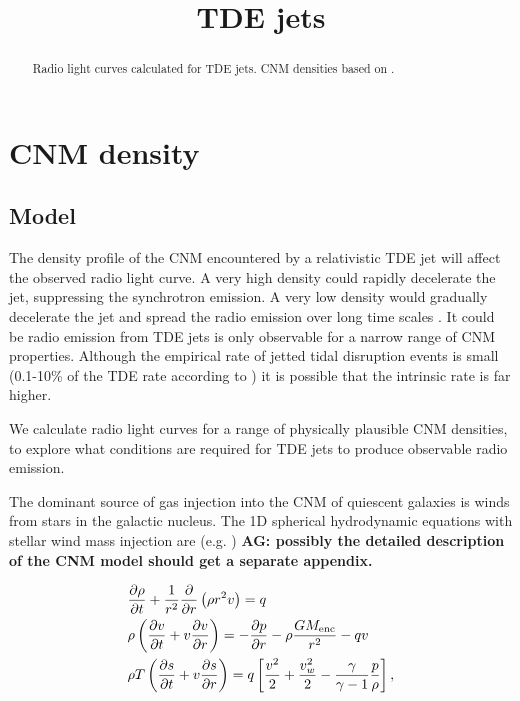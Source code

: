 \documentclass[usenatbib,fleqn]{mn2e}
\title{TDE jets}
\begin{document}
\begin{abstract}
  Radio light curves calculated for TDE jets. CNM
  densities based on \citet{Generozov+2015}. 
\end{abstract}


\section{CNM density}

\subsection{Model}

The density profile of the CNM encountered by a relativistic TDE jet
will affect the observed radio light curve. A very high density could
rapidly decelerate the jet, suppressing the synchrotron emission. A
very low density would gradually decelerate the jet and spread the
radio emission over long time scales \citep{Mimica+2015}.  It could be 
radio emission from TDE jets is only observable for a narrow range of
CNM properties. Although the empirical rate of jetted tidal disruption
events is small (0.1-10\% of the TDE rate according to
\citealt{van-Velzen+2013}) it is possible that the intrinsic rate is
far higher.

We calculate radio light curves for a range of physically plausible
CNM densities, to explore what conditions are required for TDE jets to
produce observable radio emission. 

The dominant source of gas injection into the CNM of quiescent
galaxies is winds from stars in the galactic nucleus. The 1D spherical
hydrodynamic equations with stellar wind mass injection are
(e.g. \citealt{Holzer+1970}) {\bf AG: possibly the detailed
  description of the CNM model should get a separate appendix.}


\begin{align}
  &\frac{\partial \rho}{\partial t}+\frac{1}{r^2}\frac{\partial}{\partial r}\left(\rho r^2 v\right)=q \label{eq:drhodt}\\
  &\rho \left(\frac{\partial v}{\partial t} + v\frac{\partial
      v}{\partial r}\right) =-\frac{\partial p}{\partial r}- \rho\frac{GM_{\rm enc}}{r^{2}} -q v \label{eq:dvdt}\\
  &\rho T\left(\frac{\partial s}{\partial t} + v\frac{\partial
      s}{\partial
      r}\right)=q\left[\frac{v^2}{2}+\frac{v_w^2}{2}-\frac{\gamma}{\gamma-1}
    \frac{p}{\rho} \right] ,
\label{eq:dsdt}
\end{align}
\end{document}
